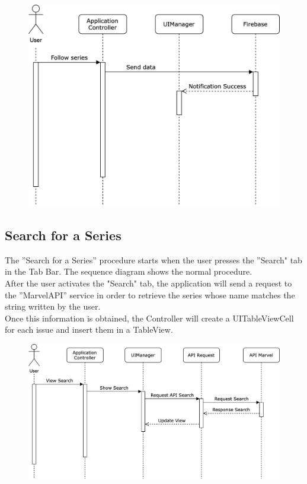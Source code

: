 \begin{figure}[h]
\centering
\includegraphics[width=\textwidth]{img/seqdiagrams/followseries}
\end{figure}

\clearpage

\subsection{Search for a Series}
The ”Search for a Series” procedure starts when the user presses the ”Search" tab in the Tab Bar. The sequence diagram shows the normal procedure. \\
After the user activates the "Search" tab, the application will send a request to the ”MarvelAPI” service in order to retrieve the series whose name matches the string written by the user. \\
Once this information is obtained, the Controller will create a UITableViewCell for each issue and insert them in a TableView. 

\vspace{5mm}

\begin{figure}[h]
\centering
\includegraphics[width=\textwidth]{img/seqdiagrams/searchseries}
\end{figure}


